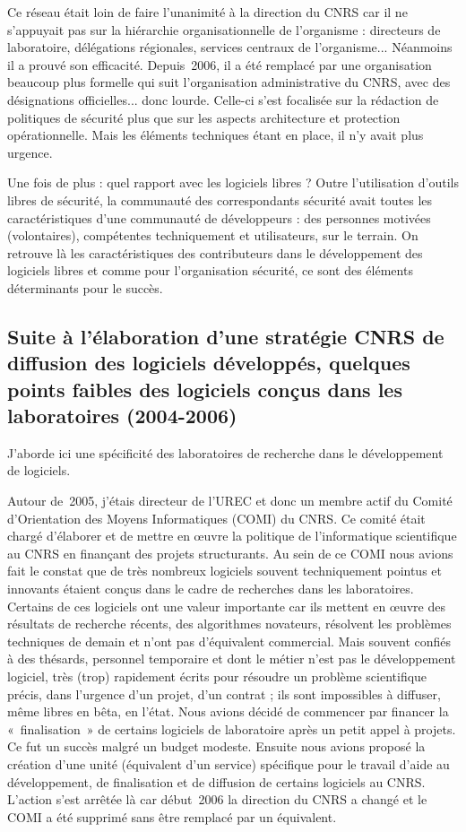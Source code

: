 \documentclass{FramateX}
\begin{document}
\begin{refsection}
Ce réseau était loin de faire l'unanimité à la direction du CNRS car il
ne s'appuyait pas sur la hiérarchie organisationnelle de l'organisme :
directeurs de laboratoire, délégations régionales, services centraux de
l'organisme... Néanmoins il a prouvé son efficacité. Depuis~2006, il a
été remplacé par une organisation beaucoup plus formelle qui suit
l'organisation administrative du CNRS, avec des désignations
officielles... donc lourde. Celle-ci s'est focalisée sur la rédaction
de politiques de sécurité plus que sur les aspects architecture et
protection opérationnelle. Mais les éléments techniques étant en place,
il n'y avait plus urgence.

Une fois de plus : quel rapport avec les logiciels libres ? Outre
l'utilisation d'outils libres de sécurité, la communauté des
correspondants sécurité avait toutes les caractéristiques d'une
communauté de développeurs : des personnes motivées (volontaires),
compétentes techniquement et utilisateurs, sur le terrain. On retrouve
là les caractéristiques des contributeurs dans le développement des
logiciels libres et comme pour l'organisation sécurité, ce sont des
éléments déterminants pour le succès.


\subsection*{Suite à l'élaboration d'une stratégie CNRS de diffusion des logiciels
développés, quelques points faibles des logiciels conçus dans les
laboratoires (2004-2006)}

J'aborde ici une spécificité des laboratoires de recherche dans le
développement de logiciels.

Autour de~2005, j'étais directeur de l'UREC et donc un membre actif du
Comité d'Orientation des Moyens Informatiques (COMI) du CNRS. Ce comité
était chargé d'élaborer et de mettre en œuvre la politique de
l'informatique scientifique au CNRS en finançant des projets
structurants. Au sein de ce COMI nous avions fait le constat que de
très nombreux logiciels souvent techniquement pointus et innovants
étaient conçus dans le cadre de recherches dans les laboratoires.
Certains de ces logiciels ont une valeur importante car ils mettent en
œuvre des résultats de recherche récents, des algorithmes novateurs,
résolvent les problèmes techniques de demain et n'ont pas d'équivalent
commercial. Mais souvent confiés à des thésards, personnel temporaire
et dont le métier n'est pas le développement logiciel, très (trop)
rapidement écrits pour résoudre un problème scientifique précis, dans
l'urgence d'un projet, d'un contrat ; ils sont impossibles à diffuser,
même libres en bêta, en l'état. Nous avions décidé de commencer par
financer la «~finalisation~» de certains logiciels de laboratoire
après un petit appel à projets. Ce fut un succès malgré un budget
modeste. Ensuite nous avions proposé la création d'une unité
(équivalent d'un service) spécifique pour le travail d'aide au
développement, de finalisation et de diffusion de certains logiciels au
CNRS. L'action s'est arrêtée là car début~2006 la direction du CNRS a
changé et le COMI a été supprimé sans être remplacé par un équivalent.


\end{refsection}
\end{document}
